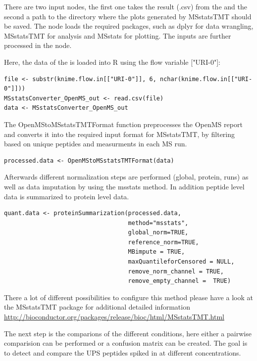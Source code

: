 \noindent There are two input nodes, the first one takes the result (.csv) from the  and the second a path to the directory where the plots generated by MSstatsTMT should be saved. The  node loads the required packages, such as dplyr for data wrangling, MSstatsTMT for analysis and MSstats for plotting. The inputs are further processed in the  node.  

\noindent Here, the data of the  is loaded into R using the flow variable ["URI-0"]:
\begin{lstlisting}
file <- substr(knime.flow.in[["URI-0"]], 6, nchar(knime.flow.in[["URI-0"]]))
MSstatsConverter_OpenMS_out <- read.csv(file)
data <- MSstatsConverter_OpenMS_out
\end{lstlisting}

\noindent The OpenMStoMSstatsTMTFormat function preprocesses the OpenMS report and converts it into the required input format for MSstatsTMT, by filtering based on unique peptides and measurments in each MS run.

\begin{lstlisting}
processed.data <- OpenMStoMSstatsTMTFormat(data)
\end{lstlisting}

\noindent Afterwards different normalization steps are performed (global, protein, runs) as well as data imputation by using the msstats method. In addition peptide level data is summarized to protein level data. 

\begin{lstlisting}
quant.data <- proteinSummarization(processed.data,
                                   method="msstats",
                                   global_norm=TRUE,
                                   reference_norm=TRUE,
                                   MBimpute = TRUE,
                                   maxQuantileforCensored = NULL,
                                   remove_norm_channel = TRUE,
                                   remove_empty_channel =  TRUE)
\end{lstlisting}
        
\noindent There a lot of different possibilities to configure this method please have a look at the MSstatsTMT package for additional detailed information \url{http://bioconductor.org/packages/release/bioc/html/MSstatsTMT.html}                       

\noindent The next step is the comparions of the different conditions, here either a pairwise comparision can be performed or a confusion matrix can be created. The goal is to detect and compare the UPS peptides spiked in at different concentrations. 

